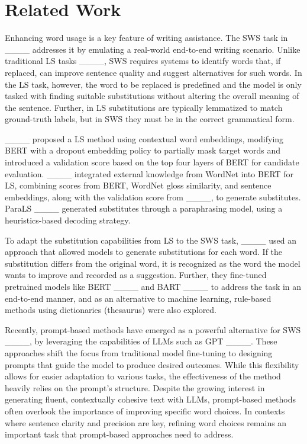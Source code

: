 \section{Related Work}
%
Enhancing word usage is a key feature of writing assistance.
The SWS task in ____ addresses it by emulating a real-world end-to-end writing scenario.
Unlike traditional LS tasks ____, SWS requires systems to identify words that, if replaced, can improve sentence quality and suggest alternatives for such words.
In the LS task, however, the word to be replaced is predefined and the model is only tasked with finding suitable substitutions without altering the overall meaning of the sentence.
Further, in LS substitutions are typically lemmatized to match ground-truth labels, but in SWS they must be in the correct grammatical form.

____ proposed a LS method using contextual word embeddings, modifying BERT with a dropout embedding policy to partially mask target words and introduced a validation score based on the top four layers of BERT for candidate evaluation.
____ integrated external knowledge from WordNet into BERT for LS, combining scores from BERT, WordNet gloss similarity, and sentence embeddings, along with the validation score from ____, to generate substitutes.
ParaLS ____ generated substitutes through a paraphrasing model, using a heuristics-based decoding strategy.

To adapt the substitution capabilities from LS to the SWS task, ____ used an approach that allowed models to generate substitutions for each word.
If the substitution differs from the original word, it is recognized as the word the model wants to improve and recorded as a suggestion.
Further, they fine-tuned pretrained models like BERT ____ and BART ____ to address the task in an end-to-end manner, and as an alternative to machine learning, rule-based methods using dictionaries (thesaurus) were also explored.

Recently, prompt-based methods have emerged as a powerful alternative for SWS ____, by leveraging the capabilities of LLMs such as GPT ____.
These approaches shift the focus from traditional model fine-tuning to designing prompts that guide the model to produce desired outcomes.
While this flexibility allows for easier adaptation to various tasks, the effectiveness of the method heavily relies on the prompt's structure.
Despite the growing interest in generating fluent, contextually cohesive text with LLMs, prompt-based methods often overlook the importance of improving specific word choices.
In contexts where sentence clarity and precision are key, refining word choices remains an important task that prompt-based approaches need to address.

